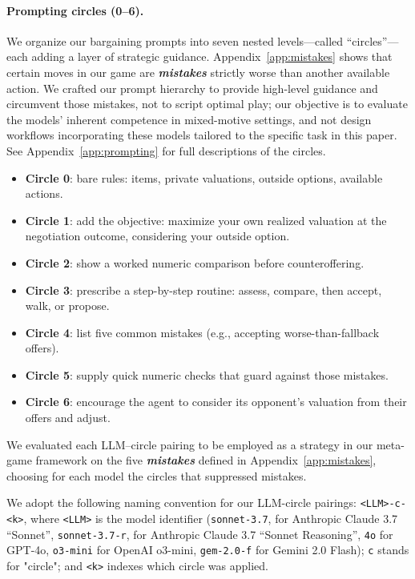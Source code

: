 \documentclass{article}
\theoremstyle{plain}
\theoremstyle{definition}
\theoremstyle{remark}
\newcommand{\term}[1]{\textbf{\textit{#1}}}
\begin{document}
\paragraph{Prompting circles (0–6).}
We organize our bargaining prompts into seven nested levels---called
“circles”---each adding a layer of strategic guidance.  
Appendix~\ref{app:mistakes} shows that certain moves in our game are
\term{mistakes} strictly worse than another available
action.  
We crafted our prompt hierarchy to provide high-level guidance and circumvent 
those mistakes, not to script optimal play; our objective is to
evaluate the models’ inherent  competence in mixed-motive settings, and not design workflows incorporating these models tailored to the specific task in this paper. See Appendix~\ref{app:prompting} for full descriptions of the circles.

\begin{itemize}
  \item \textbf{Circle 0}: bare rules: items, private valuations, outside options, available actions.
  \item \textbf{Circle 1}: add the objective: maximize your own realized valuation at the negotiation outcome, considering your outside option. %
  \item \textbf{Circle 2}: show a worked numeric comparison before counteroffering.
  \item \textbf{Circle 3}: prescribe a step-by-step routine: assess, compare, then accept, walk, or propose.
  \item \textbf{Circle 4}: list five common mistakes (e.g., accepting worse-than-fallback offers).
  \item \textbf{Circle 5}: supply quick numeric checks that guard against those mistakes.
  \item \textbf{Circle 6}: encourage the agent to consider its opponent’s valuation from their offers and adjust.
\end{itemize}


We evaluated each LLM–circle pairing to be employed as a strategy in our meta-game framework on the five \term{mistakes} defined in Appendix~\ref{app:mistakes}, choosing for each model the  circles that suppressed mistakes.

We adopt the following naming convention for our LLM-circle pairings: \texttt{<LLM>-c-<k>}, where \texttt{<LLM>} is the model identifier (\texttt{sonnet-3.7}, for Anthropic Claude 3.7 “Sonnet”, \texttt{sonnet-3.7-r}, for Anthropic Claude 3.7 “Sonnet Reasoning”, \texttt{4o} for GPT-4o, \texttt{o3-mini} for OpenAI o3-mini, \texttt{gem-2.0-f} for Gemini 2.0 Flash); \texttt{c} stands for "circle"; and \texttt{<k>} indexes which circle was applied.
\end{document}
